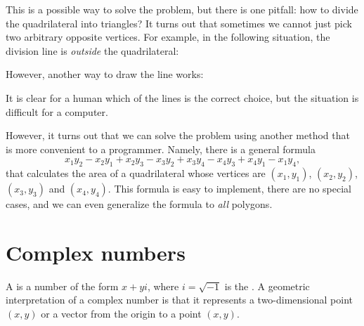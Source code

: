 This is a possible way to solve the problem,
but there is one pitfall:
how to divide the quadrilateral into triangles?
It turns out that sometimes we cannot just pick
two arbitrary opposite vertices.
For example, in the following situation,
the division line is \emph{outside} the quadrilateral:
\begin{center}
\end{center}
However, another way to draw the line works:
\begin{center}
\end{center}
It is clear for a human which of the lines is the correct
choice, but the situation is difficult for a computer.
                           
However, it turns out that we can solve the problem using
another method that is more convenient to a programmer.
Namely, there is a general formula
\[x_1y_2-x_2y_1+x_2y_3-x_3y_2+x_3y_4-x_4y_3+x_4y_1-x_1y_4,\]
that calculates the area of a quadrilateral
whose vertices are
$(x_1,y_1)$,
$(x_2,y_2)$,
$(x_3,y_3)$ and
$(x_4,y_4)$.
This formula is easy to implement, there are no special
cases, and we can even generalize the formula
to \emph{all} polygons.

\section{Complex numbers}


A  is a number of the form $x+y i$,
where $i = \sqrt{-1}$ is the .
A geometric interpretation of a complex number is
that it represents a two-dimensional point $(x,y)$
or a vector from the origin to a point $(x,y)$.

